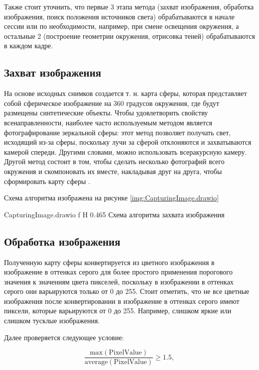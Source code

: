 Также стоит уточнить, что первые 3 этапа метода (захват изображения, обработка изображения, поиск положения источников света) обрабатываются в начале сессии или по необходимости, например, при смене освещения окружения, а остальные 2 (построение геометрии окружения, отрисовка теней) обрабатываются в каждом кадре.

\subsection{Захват изображения}

На основе исходных снимков создается т. н. карта сферы, которая представляет собой сферическое изображение на 360 градусов окружения, где будут размещены синтетические объекты. Чтобы удовлетворить свойству всенаправленности, наиболее часто используемым методом является фотографирование зеркальной сферы: этот метод позволяет получать свет, исходящий из-за сферы, поскольку лучи за сферой отклоняются и захватываются камерой спереди. Другими словами, можно использовать всеракурсную камеру. Другой метод состоит в том, чтобы сделать несколько фотографий всего окружения и скомпоновать их вместе, накладывая друг на друга, чтобы сформировать карту сферы \cite{osti2019real}.

Схема алгоритма изображена на рисунке \ref{img:CapturingImage.drawio}

{CapturingImage.drawio}
{f}
{H}
{0.465\textwidth}
{Схема алгоритма захвата изображения}

\subsection{Обработка изображения}

Полученную карту сферы конвертируется из цветного изображения в изображение в оттенках серого для более простого применения порогового значения к значениям цвета пикселей, поскольку в изображении в оттенках серого они варьируются только от 0 до 255. Стоит отметить, что не все цветные изображения после конвертировании в изображение в оттенках серого имеют пиксели, которые варьируются от 0 до 255. Например, слишком яркие или слишком тусклые изображения.

Далее проверяется следующее условие:

\begin{equation}
	\frac{\text{max}(\text{PixelValue})}{\text{average}(\text{PixelValue})} \geqslant 1.5,
\end{equation}

